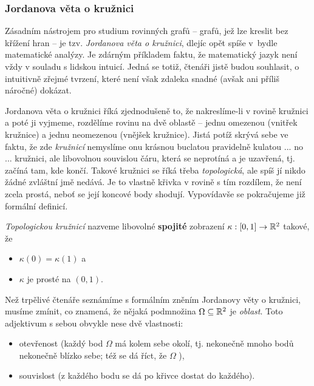 \subsubsection{Jordanova věta o kružnici}
\label{sssec:jordanova-veta-o-kruznici}

Zásadním nástrojem pro studium rovinných grafů -- grafů, jež lze kreslit bez
křížení hran -- je tzv. \emph{Jordanova věta o kružnici}, dlejíc opět spíše
v~bydle matematické analýzy. Je zdárným příkladem faktu, že matematický jazyk
není vždy v souladu s lidskou intuicí. Jedná se totiž, čtenáři jistě budou
souhlasit, o intuitivně zřejmé tvrzení, které není však zdaleka snadné (avšak
ani příliš náročné) dokázat.

Jordanova věta o kružnici říká zjednodušeně to, že nakreslíme-li v rovině
kružnici a poté ji vyjmeme, rozdělíme rovinu na dvě oblastě -- jednu omezenou 
(vnitřek kružnice) a jednu neomezenou (vnějšek kružnice). Jistá potíž skrývá
sebe ve faktu, že zde \emph{kružnicí} nemyslíme onu krásnou buclatou pravidelně
kulatou ... no ... kružnici, ale libovolnou souvislou čáru, která se neprotíná a
je uzavřená, tj. začíná tam, kde končí. Takové kružnici se říká třeba
\emph{topologická}, ale spíš jí nikdo žádné zvláštní jmě nedává. Je to vlastně
křivka v rovině s tím rozdílem, že není zcela prostá, neboť se její koncové body
shodují. Vypovídavše se pokračujeme již formální definicí.

\begin{definition}
 \label{def:topologicka-kruznice}
 \emph{Topologickou kružnicí} nazveme libovolné \textbf{spojité} zobrazení
 $\kappa: [0,1] \to \mathbb{R}^2$ takové, že
 \begin{itemize}
  \item $\kappa(0) = \kappa(1)$ a
  \item $\kappa$ je prosté na $(0,1)$.
 \end{itemize}
\end{definition}

Než trpělivé čtenáře seznámíme s formálním zněním Jordanovy věty o kružnici,
musíme zmínit, co znamená, že nějaká podmnožina $\Omega \subseteq \mathbb{R}^2$ je
\emph{oblast}. Toto adjektivum s sebou obvykle nese dvě vlastnosti:
\begin{itemize}
 \item otevřenost (každý bod $\Omega$ má kolem sebe okolí, tj. nekonečně mnoho
  bodů nekonečně blízko sebe; též se dá říct, že $\Omega$ ),
 \item souvislost (z každého bodu se dá po křivce dostat do každého).
\end{itemize}

